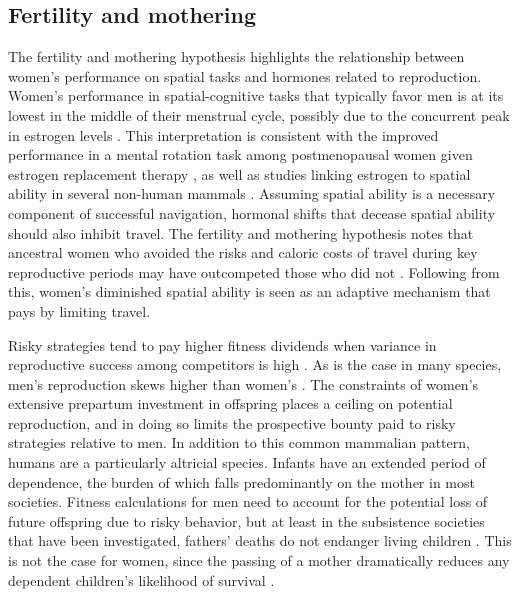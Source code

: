 	\subsection{Fertility and mothering}
	\label{sec:1.1}
The fertility and mothering hypothesis highlights the relationship between women's performance on spatial tasks and hormones related to reproduction.  Women's performance in spatial-cognitive tasks that typically favor men is at its lowest in the middle of their menstrual cycle, possibly due to the concurrent peak in estrogen levels \citep{hampson1988reciprocal, hampson1990estrogen, mccormick2001menstrual, komnenich1978gonadal, hausmann2000sex}.  This interpretation is consistent with the improved performance in a mental rotation task among postmenopausal women given estrogen replacement therapy \citep{duka2000effects}, as well as studies linking estrogen to spatial ability in several non-human mammals \citep{fugger1998sex, lacreuse1999spatial, frye1995estrus}.  Assuming spatial ability is a necessary component of successful navigation, hormonal shifts that decease spatial ability should also inhibit travel.  The fertility and mothering hypothesis notes that ancestral women who avoided the risks and caloric costs of travel during key reproductive periods may have outcompeted those who did not \citep{sherry1997evolution}.  Following from this, women's diminished spatial ability is seen as an adaptive mechanism that pays by limiting travel.
	
Risky strategies tend to pay higher fitness dividends when variance in reproductive success among competitors is high \citep{darwin1871sexual, bateman1948intra, clutton1991sexual, clutton2007sexual}.  As is the case in many species, men's reproduction skews higher than women's \citep{trivers1972parental, wilson1985competitiveness}.  The constraints of women's extensive prepartum investment in offspring places a ceiling on potential reproduction, and in doing so limits the prospective bounty paid to risky strategies relative to men.  In addition to this common mammalian pattern, humans are a particularly altricial species.  Infants have an extended period of dependence, the burden of which falls predominantly on the mother in most societies.  Fitness calculations for men need to account for the potential loss of future offspring due to risky behavior, but at least in the subsistence societies that have been investigated, fathers' deaths do not endanger living children \citep{sear2008keeps}.  This is not the case for women, since the passing of a mother dramatically reduces any dependent children's likelihood of survival \citep{hill1996ache, sear2008keeps}.  

